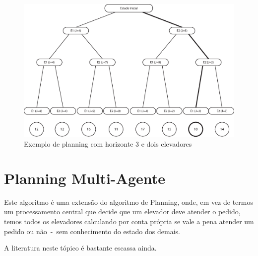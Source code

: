 \begin{figure}[htb!]
  \centering
  \includegraphics[scale=0.6]{img/planning.eps}
  \caption{Exemplo de planning com horizonte 3 e dois elevadores}
\label{fig:planning}
\end{figure}

\section{Planning Multi-Agente}

Este algoritmo é uma extensão do algoritmo de Planning, onde, em vez de termos
um processamento central que decide que um elevador deve atender o pedido, temos
todos os elevadores calculando por conta própria se vale a pena atender um
pedido ou não~-~sem conhecimento do estado dos demais.

A literatura neste tópico é bastante escassa ainda.